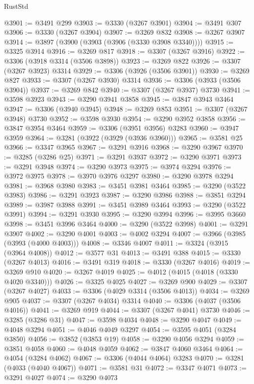 \begin{lexlean}{RustStd}
\begin{coremodule}
@3901 := @3491 @299
@3903 := @3330 (@3267 @3901)
@3904 := @3491 @307
@3906 := @3330 (@3267 @3904)
@3907 := @3269 @832
@3908 := @3267 @3907
@3914 := @3897 (@3900 (@3903 (@3906 (@3330 @3908 @3340))))
@3915 := @3325 @3914
@3916 := @3269 @817
@3918 := @3307 (@3267 @3916)
@3922 := @3306 (@3918 @3314 (@3506 @3898))
@3923 := @3269 @822
@3926 := @3307 (@3267 @3923) @3314
@3929 := @3306 (@3926 (@3506 @3901))
@3930 := @3269 @827
@3933 := @3307 (@3267 @3930) @3314
@3936 := @3306 (@3933 (@3506 @3904))
@3937 := @3269 @842
@3940 := @3307 (@3267 @3937) @3730
@3941 := @3598 @3923
@3943 := @3290 @3941 @3858
@3945 := @3847 @3943 @3464
@3947 := @3306 (@3940 @3945)
@3948 := @3269 @853
@3951 := @3307 (@3267 @3948) @3730
@3952 := @3598 @3930
@3954 := @3290 @3952 @3858
@3956 := @3847 @3954 @3464
@3959 := @3306 (@3951 @3956) @3283
@3960 := @3947 @3959
@3964 := @3281 (@3922 (@3929 (@3936 @3960)))
@3965 := @3581 @25
@3966 := @3347 @3965
@3967 := @3291 @3916
@3968 := @3290 @3967
@3970 := @3285 (@3286 @25)
@3971 := @3291 @3937
@3972 := @3290 @3971
@3973 := @3291 @3948
@3974 := @3290 @3973
@3975 := @3974 @3294
@3976 := @3972 @3975
@3978 := @3970 @3976 @3297
@3980 := @3290 @3978 @3294
@3981 := @3968 @3980
@3983 := @3451 @3981 @3464
@3985 := @3290 (@3522 @3983)
@3986 := @3291 @3923
@3987 := @3290 @3986
@3988 := @3851 @3294
@3989 := @3987 @3988
@3991 := @3451 @3989 @3464
@3993 := @3290 (@3522 @3991)
@3994 := @3291 @3930
@3995 := @3290 @3994
@3996 := @3995 @3660
@3998 := @3451 @3996 @3464
@4000 := @3290 (@3522 @3998)
@4001 := @3291 @3907
@4002 := @3290 @4001
@4003 := @4002 @3294
@4007 := @3966 (@3985 (@3993 (@4000 @4003)))
@4008 := @3346 @4007
@4011 := @3324 (@3915 (@3964 @4008))
@4012 := @3577 @31
@4013 := @3491 @388
@4015 := @3330 (@3267 @4013)
@4016 := @3491 @319
@4018 := @3330 (@3267 @4016)
@4019 := @3269 @910
@4020 := @3267 @4019
@4025 := @4012 (@4015 (@4018 (@3330 @4020 @3340)))
@4026 := @3325 @4025
@4027 := @3269 @900
@4029 := @3307 (@3267 @4027)
@4033 := @3306 (@4029 @3314 (@3506 @4013))
@4034 := @3269 @905
@4037 := @3307 (@3267 @4034) @3314
@4040 := @3306 (@4037 (@3506 @4016))
@4041 := @3269 @919
@4044 := @3307 (@3267 @4041) @3730
@4046 := @3285 (@3286 @31)
@4047 := @3598 @4034
@4048 := @3290 @4047
@4049 := @4048 @3294
@4051 := @4046 @4049 @3297
@4054 := @3595 @4051 (@3284 @3850)
@4056 := @3852 (@3853 @19)
@4058 := @3290 @4056 @3294
@4059 := @3851 @4058
@4060 := @4048 @4059
@4062 := @3847 @4060 @3464
@4064 := @4054 (@3284 @4062)
@4067 := @3306 (@4044 @4064) @3283
@4070 := @3281 (@4033 (@4040 @4067))
@4071 := @3581 @31
@4072 := @3347 @4071
@4073 := @3291 @4027
@4074 := @3290 @4073

\end{coremodule}
\end{lexlean}
